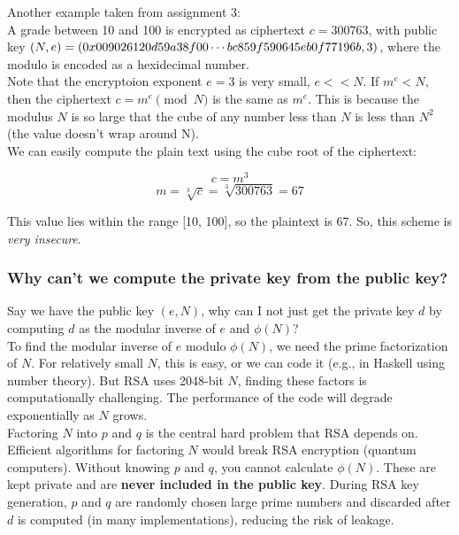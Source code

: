 Another example taken from assignment 3: \\

A grade between 10 and 100 is encrypted as ciphertext $c = 300763$, with public key $(N,e ) = \\
(0x009026120d59a38f00 \cdots bc859f590645eb0f77196b, 3)$, where the modulo is encoded as a hexidecimal number. \\

Note that the encryptoion exponent $e = 3$ is very small, $e << N$. If $m^e < N$, then the ciphertext 
$c = m^e \pmod{N}$ is the same as $m^e$. This is because the modulus $N$ is so large that the cube of any number less than $N$ is less than $N^2$ (the value doesn't wrap around N). \\

We can easily compute the plain text using the cube root of the ciphertext:

\[ c = m^3 \]
\[ m = \sqrt[3]{c} = \sqrt[3]{300763} = 67\]

This value lies within the range [10, 100], so the plaintext is 67. So, this scheme is \emph{very insecure}.

\subsubsection{Why can't we compute the private key from the public key?}
Say we have the public key $(e,N)$, why can I not just get the private key $d$ by computing $d$ as the modular inverse of $e$ and $\phi(N)$? \\

To find the modular inverse of $e$ modulo $\phi(N)$, we need the prime factorization of $N$. 
For relatively small $N$, this is easy, or we can code it (e.g., in Haskell using number theory).
But RSA uses 2048-bit $N$, finding these factors is computationally challenging.
The performance of the code will degrade exponentially as $N$ grows. \\

Factoring $N$ into $p$ and $q$ is the central hard problem that RSA depends on. Efficient algorithms for factoring $N$ would break RSA encryption (quantum computers).
Without knowing $p$ and $q$, you cannot calculate $\phi(N)$. 
These are kept private and are \textbf{never included in the public key}. 
During RSA key generation, $p$ and $q$ are randomly chosen large prime numbers and discarded after $d$ is computed (in many implementations), reducing the risk of leakage.
